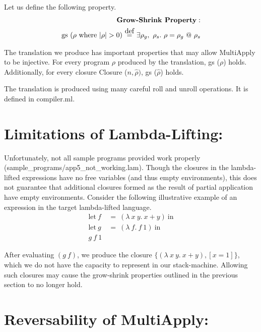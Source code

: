 \documentclass[11pt]{article}
\newcommand\myeq{\stackrel{\mathclap{\normalfont\mbox{def}}}{=}}
\begin{document}
Let us define the following property.
\begin{align*}
    \textbf{Grow-Shrink Property}:\\
    \text{gs}\ (\rho\ \text{where}\ |\rho| > 0)\ \myeq\ \exists \rho_g,\ \rho_s.\ \rho = \rho_g\ @\ \rho_s
\end{align*}
    
    The translation we produce has important properties that may allow MultiApply to be injective. For every program $\rho$ produced by the translation, gs ($\rho$) holds. Additionally, for every closure Closure ($n, \hat{\rho})$, gs ($\hat{\rho}$) holds. 

The translation is produced using many careful roll and unroll operations. It is defined in compiler.ml.

\section*{Limitations of Lambda-Lifting:}

Unfortunately, not all sample programs provided work properly (sample\_programs/app5\_not\_working.lam). Though the closures in the lambda-lifted expressions have no free variables (and thus empty environments), this does not guarantee that additional closures formed as the result of partial application have empty environments. Consider the following illustrative example of an expression in the target lambda-lifted language.
\begin{align*}
    \text{let}\ f\ &=\ (\lambda\ x\ y.\ x + y)\ \text{in}\\
    \text{let}\ g\ &=\ (\lambda\ f.\ f\ 1)\ \text{in}\\
    g\ f\ 1
\end{align*}

After evaluating $(g\ f)$, we produce the closure $\{(\lambda\ x\ y.\ x + y), [x = 1]\}$, which we do not have the capacity to represent in our stack-machine. Allowing such closures may cause the grow-shrink properties outlined in the previous section to no longer hold.


\section*{Reversability of MultiApply:}
\end{document}
